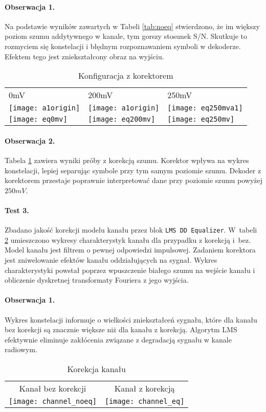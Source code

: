 \paragraph{Obserwacja 1.}
Na podstawie wyników zawartych w Tabeli \ref{tab:noeq} stwierdzono, że im większy poziom szumu addytywnego w kanale, tym gorszy stosunek S/N. 
Skutkuje to rozmyciem się konstelacji i błędnym rozpoznawaniem symboli w dekoderze.
Efektem tego jest zniekształcony obraz na wyjściu. 


\begin{table}[ht]
\centering
\caption{Konfiguracja z korektorem}
\label{tab:eq}
\begin{tabular}{|l|l|l|}
\hline
0mV      & 200mV    & 250mV    \\
\texttt{[image: a1origin]} & \texttt{[image: a1origin]} & \texttt{[image: eq250mva1]} \\
\texttt{[image: eq0mv]}   & \texttt{[image: eq200mv]}   & \texttt{[image: eq250mv]}  \\ \hline
\end{tabular}
\end{table}

\paragraph{Obserwacja 2.}
Tabela \ref{tab:eq} zawiera wyniki próby z korekcją szumu.
Korektor wpływa na wykres konstelacji, lepiej separując symbole przy tym samym poziomie szumu.
Dekoder z korektorem przestaje poprawnie interpretować dane przy poziomie szumu powyżej $250mV$.

\paragraph{Test 3.}
Zbadano jakość korekcji modelu kanału przez blok \texttt{LMS DD Equalizer}.
W~tabeli \ref{channel_eq} umieszczono wykresy charakterystyk kanału dla przypadku z korekcją i~bez.
Model kanału jest filtrem o pewnej odpowiedzi impulsowej.
Zadaniem korektora jest zniwelowanie efektów kanału oddziałujących na sygnał.
Wykres charakterystyki powstał poprzez wpuszczenie białego szumu na wejście kanału i obliczenie dyskretnej transformaty Fouriera z jego wyjścia.

\paragraph{Obserwacja 1.}
Wykres konstelacji informuje o wielkości zniekształceń sygnału, które dla kanału bez korekcji są znacznie większe niż dla kanału z korekcją.
Algorytm LMS efektywnie eliminuje zakłócenia związane z degradacją sygnału w kanale radiowym.


\begin{table}[ht]
\centering
\caption{Korekcja kanału}
\label{channel_eq}
\begin{tabular}{|c|c|}
\hline
Kanał bez korekcji & Kanał z korekcją \\
\texttt{[image: channel\_noeq]}      & \texttt{[image: channel\_eq]}      \\ \hline
\end{tabular}
\end{table}




